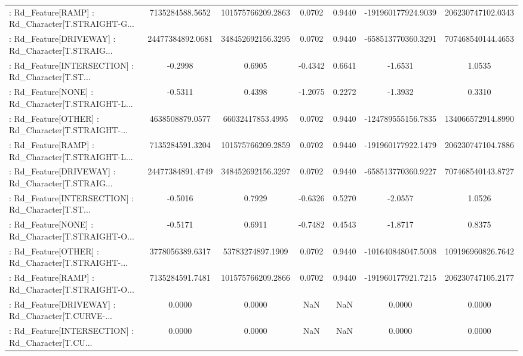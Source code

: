 \begin{longtable}{p{4cm}cccccc}
 : Rd\_Feature[RAMP] : Rd\_Character[T.STRAIGHT-G... &   7135284588.5652 & 101575766209.2863 &  0.0702 &       0.9440 & -191960177924.9039 & 206230747102.0343 \\
 : Rd\_Feature[DRIVEWAY] : Rd\_Character[T.STRAIG... &  24477384892.0681 & 348452692156.3295 &  0.0702 &       0.9440 & -658513770360.3291 & 707468540144.4653 \\
 : Rd\_Feature[INTERSECTION] : Rd\_Character[T.ST... &           -0.2998 &            0.6905 & -0.4342 &       0.6641 &            -1.6531 &            1.0535 \\
 : Rd\_Feature[NONE] : Rd\_Character[T.STRAIGHT-L... &           -0.5311 &            0.4398 & -1.2075 &       0.2272 &            -1.3932 &            0.3310 \\
 : Rd\_Feature[OTHER] : Rd\_Character[T.STRAIGHT-... &   4638508879.0577 &  66032417853.4995 &  0.0702 &       0.9440 & -124789555156.7835 & 134066572914.8990 \\
 : Rd\_Feature[RAMP] : Rd\_Character[T.STRAIGHT-L... &   7135284591.3204 & 101575766209.2859 &  0.0702 &       0.9440 & -191960177922.1479 & 206230747104.7886 \\
 : Rd\_Feature[DRIVEWAY] : Rd\_Character[T.STRAIG... &  24477384891.4749 & 348452692156.3297 &  0.0702 &       0.9440 & -658513770360.9227 & 707468540143.8727 \\
 : Rd\_Feature[INTERSECTION] : Rd\_Character[T.ST... &           -0.5016 &            0.7929 & -0.6326 &       0.5270 &            -2.0557 &            1.0526 \\
 : Rd\_Feature[NONE] : Rd\_Character[T.STRAIGHT-O... &           -0.5171 &            0.6911 & -0.7482 &       0.4543 &            -1.8717 &            0.8375 \\
 : Rd\_Feature[OTHER] : Rd\_Character[T.STRAIGHT-... &   3778056389.6317 &  53783274897.1909 &  0.0702 &       0.9440 & -101640848047.5008 & 109196960826.7642 \\
 : Rd\_Feature[RAMP] : Rd\_Character[T.STRAIGHT-O... &   7135284591.7481 & 101575766209.2866 &  0.0702 &       0.9440 & -191960177921.7215 & 206230747105.2177 \\
 : Rd\_Feature[DRIVEWAY] : Rd\_Character[T.CURVE-... &            0.0000 &            0.0000 &     NaN &          NaN &             0.0000 &            0.0000 \\
 : Rd\_Feature[INTERSECTION] : Rd\_Character[T.CU... &            0.0000 &            0.0000 &     NaN &          NaN &             0.0000 &            0.0000 \\

\end{longtable}
